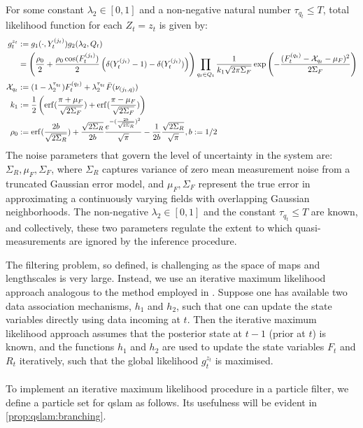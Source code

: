 \begin{defn}
For some constant $\lambda_2 \in [0,1]$ and a non-negative natural number $ \tau_{q_t} \leq T$,  total likelihood function for each $Z_t=z_t$ is given by:
\begin{align}
g_t^{z_t} &: = g_1(\cdot, Y_t^{(j_t)}) g_2(\lambda_2, Q_t) \label{qslam:defn:globallikelihood}\\ 
& = \left(\frac{\rho_0}{2} + \frac{\rho_0  \cos(F_t^{(j_t)}) }{2} \left( \delta(Y_t^{(j_t)} - 1) - \delta(Y_t^{(j_t)}) \right) \right) \prod_{q_t \in Q_t} \frac{1}{k_1\sqrt{2\pi \Sigma_F}} \exp \left( -\frac{( F_t^{(q_t)} - \mathcal{X}_{q_t} - \mu_F )^2}{2 \Sigma_F }\right) \\
\mathcal{X}_{q_t} &:= (1 - \lambda_2^{\tau_{q_t}})F_t^{(q_t)} + \lambda_2^{\tau_{q_t}} \bar{F}(\nu_{(j_t,q)}) \\
k_1&:= \frac{1}{2}\left(\mathrm{erf}(\frac{\pi + \mu_F}{\sqrt{2\Sigma_F}}) + \mathrm{erf}(\frac{\pi - \mu_F}{\sqrt{2\Sigma_F}})\right) \\
\rho_0 &: =  \mathrm{erf}(\frac{2b}{\sqrt{2\Sigma_R}}) + \frac{\sqrt{2\Sigma_R}}{2b} \frac{e^{-(\frac{2b}{\sqrt{2\Sigma_R}})^2}}{\sqrt{\pi}}  - \frac{1}{2b}\frac{\sqrt{2\Sigma_R}}{\sqrt{\pi}}, b := 1/2
\end{align}
The noise parameters that govern the level of uncertainty in the system are: $\Sigma_R, \mu_F, \Sigma_F$, where $\Sigma_R$ captures variance of zero mean measurement noise from a truncated Gaussian error model, and $ \mu_F, \Sigma_F$ represent the true error in approximating a continuously varying fields with overlapping Gaussian neighborhoods. The non-negative $\lambda_2 \in [0,1]$ and the constant $ \tau_{q_t} \leq T$  are known, and collectively, these two parameters regulate the extent to which quasi-measurements are ignored by the inference procedure. 
\end{defn} 

The filtering problem, so defined, is challenging as the space of maps and lengthscales is very large. Instead, we use an iterative maximum likelihood approach analogous to the method employed in \cite{thrun2001probabilistic}. Suppose one has available two data association mechanisms, $h_1$ and $h_2$, such that one can update the state variables directly using data incoming at $t$. Then the iterative maximum likelihood approach assumes that the posterior state at $t-1$ (prior at $t$) is known, and the functions $h_1$ and $h_2$ are used to update the state variables $F_t$ and $R_t$ iteratively, such that the global likelihood $g_t^{z_t}$ is maximised.\\
\\
To implement an iterative maximum likelihood procedure in a particle filter, we define a particle set for qslam as follows. Its usefulness will be evident in \cref{prop:qslam:branching}. 

